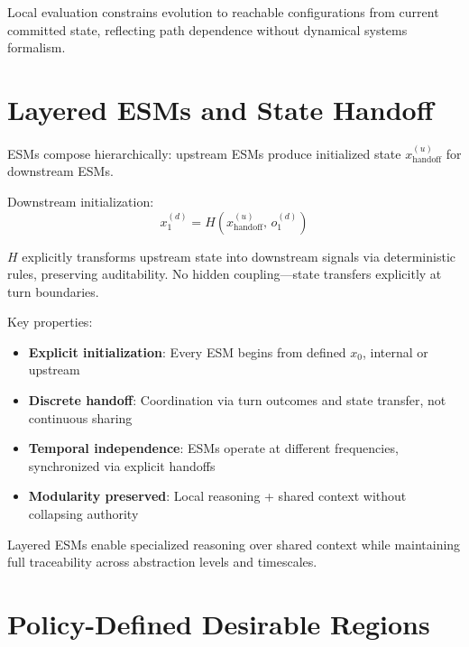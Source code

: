 \documentclass[11pt]{article}
\begin{document}
Local evaluation constrains evolution to reachable configurations from current committed state, reflecting path dependence without dynamical systems formalism.

\section{Layered ESMs and State Handoff}
\label{sec:layered_esms}

ESMs compose hierarchically: upstream ESMs produce initialized state $x^{(u)}_{\text{handoff}}$ for downstream ESMs.

Downstream initialization:
\begin{equation}
x^{(d)}_{1} = H\!\left(x^{(u)}_{\text{handoff}},\, o^{(d)}_{1}\right)
\end{equation}

$H$ explicitly transforms upstream state into downstream signals via deterministic rules, preserving auditability. No hidden coupling---state transfers explicitly at turn boundaries.

Key properties:
\begin{itemize}
\item \textbf{Explicit initialization}: Every ESM begins from defined $x_0$, internal or upstream
\item \textbf{Discrete handoff}: Coordination via turn outcomes and state transfer, not continuous sharing
\item \textbf{Temporal independence}: ESMs operate at different frequencies, synchronized via explicit handoffs
\item \textbf{Modularity preserved}: Local reasoning + shared context without collapsing authority
\end{itemize}

Layered ESMs enable specialized reasoning over shared context while maintaining full traceability across abstraction levels and timescales.


\section{Policy-Defined Desirable Regions}
\label{sec:desirable_regions}
\end{document}
